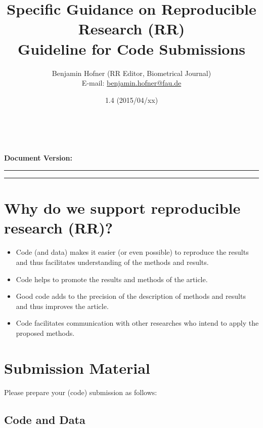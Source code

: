 \documentclass[12pt,a4paper]{article}
\title{Specific Guidance on Reproducible Research (RR)\\[0.2em]
  \large Guideline for Code Submissions}
\author{Benjamin Hofner (RR Editor, Biometrical Journal)\\
  E-mail: \href{mailto:benjamin.hofner@fau.de}{benjamin.hofner@fau.de}}
\date{1.4 (2015/04/xx)}
\makeatletter
\renewcommand{\maketitle}{\bgroup\setlength{\parindent}{0pt}
  \begin{flushleft}
    \vspace*{3cm}
    \textbf{\Large \@title}\\[1em]

    \@author\\[0.5em]

    \textbf{Document Version:} \@date
    \vspace{2em}
  \end{flushleft}\egroup
}
\makeatother
\begin{document}
\maketitle

\hrule

\tableofcontents

\vspace{2em}
\hrule
\vspace{0.5cm}

\setlength{\parskip}{0.2em}

\section*{Why do we support reproducible research (RR)?}
\begin{itemize}
\item Code (and data) makes it easier (or even possible) to reproduce the results
  and thus facilitates understanding of the methods and results.
\item Code helps to promote the results and methods of the article.
\item Good code adds to the precision of the description of methods and results
  and thus improves the article.
\item Code facilitates communication with other researches who intend to apply
  the proposed methods.
\end{itemize}

\newpage
\setcounter{section}{0}

\section{Submission Material}

Please prepare your (code) submission as follows:

\subsection{Code and Data}
\end{document}
